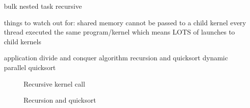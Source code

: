 bulk
nested
task
recursive

things to watch out for:
shared memory cannot be passed to a child kernel
every thread executed the same program/kernel which means LOTS of launches to child kernels

application
divide and conquer algorithm
recursion and quicksort
dynamic parallel quicksort



\begin{figure}[ht]
	\centering
	\caption{Recursive kernel call}
	\label{fig:recursive-kernel}
\end{figure}


\begin{figure}[ht]
	\centering
	\caption{Recursion and quicksort}
	\label{fig:recursion-quicksort}
\end{figure}